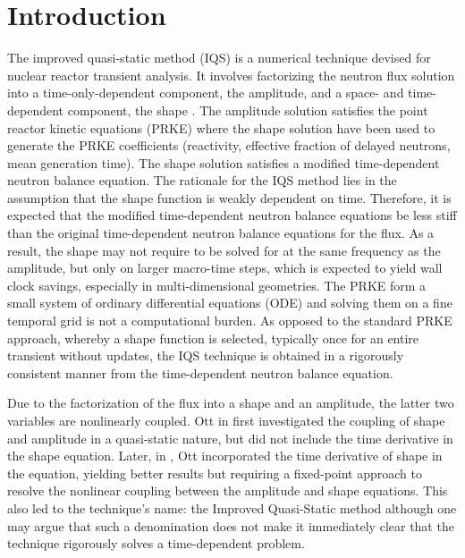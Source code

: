 \documentclass{elsarticle}
\begin{document}

\section{Introduction}

The improved quasi-static method (IQS) is a numerical technique devised for nuclear reactor transient analysis. It involves factorizing the neutron flux 
solution into a time-only-dependent component, the amplitude, and a space- and time-dependent component, the shape \cite{Ott_1966,Devooght_1984,Monier_diss,Sissaoui_1995,Dulla2008}. 
The amplitude solution satisfies the point reactor kinetic equations (PRKE) where the shape solution have been used to generate the PRKE coefficients 
(reactivity, effective fraction of delayed neutrons, mean generation time). The shape solution satisfies a modified time-dependent neutron balance equation. 
The rationale for the IQS method lies in the assumption that the shape function is weakly dependent on time. Therefore, it is expected that the modified time-dependent neutron 
balance equations be less stiff than the original time-dependent neutron balance equations for the flux. As a result, the shape may not require to be solved for at the same frequency 
as the amplitude, but only on larger macro-time steps, which is expected to yield wall clock savings, especially in multi-dimensional geometries. The PRKE form a small system of ordinary
differential equations (ODE) and solving them on a fine temporal grid is not a computational burden. As opposed to the standard PRKE approach, whereby a 
shape function is selected, typically once for an entire transient without updates, the IQS technique is obtained in a rigorously consistent manner from the 
time-dependent neutron balance equation.

Due to the factorization of the flux into a shape and an amplitude, the latter two variables are nonlinearly coupled. Ott in \cite{Ott_1966} first investigated the coupling of 
shape and amplitude in a quasi-static nature, but did not include the time derivative in the shape equation. Later, in \cite{Ott_1969}, Ott incorporated the time derivative of 
shape in the equation, yielding better results but requiring a fixed-point approach to resolve the nonlinear coupling between the amplitude and shape equations. This also 
led to the technique's name: the Improved Quasi-Static method although one may argue that such a denomination does not make it immediately clear that the technique rigorously 
solves a time-dependent problem. 
\end{document}
